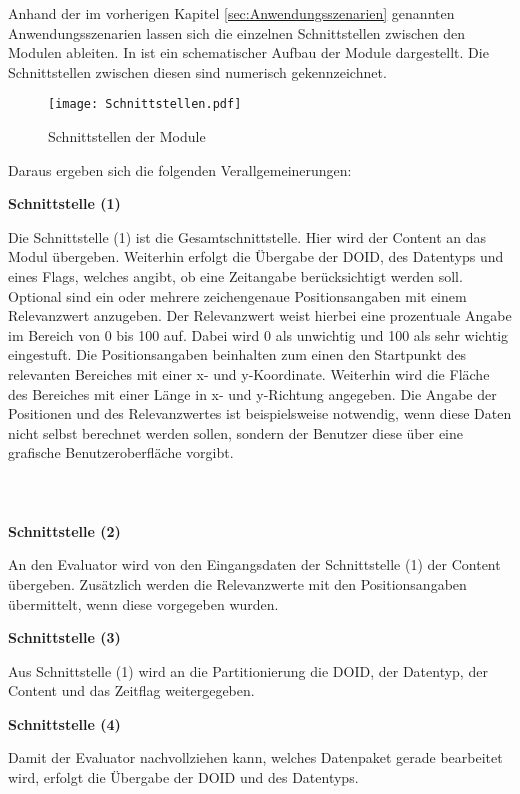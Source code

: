 Anhand der im vorherigen Kapitel \ref{sec:Anwendungsszenarien} genannten Anwendungsszenarien lassen
sich die einzelnen Schnittstellen zwischen den Modulen ableiten. In
 ist ein schematischer Aufbau der Module
dargestellt. Die Schnittstellen zwischen diesen sind numerisch gekennzeichnet.

\begin{figure}[H]
\centering
\texttt{[image: Schnittstellen.pdf]}
\caption{Schnittstellen der Module}
\label{fig:Schnittstellen}
\end{figure}

Daraus ergeben sich die folgenden Verallgemeinerungen:

\textbf{Schnittstelle (1)}

Die Schnittstelle (1) ist die Gesamtschnittstelle. Hier wird der
Content an das Modul übergeben. Weiterhin erfolgt die Übergabe der \gls{DOID}, des
Datentyps und eines Flags, welches angibt, ob eine Zeitangabe berücksichtigt
werden soll.
Optional sind ein oder mehrere zeichengenaue Positionsangaben mit einem
Relevanzwert anzugeben. Der Relevanzwert weist hierbei eine
prozentuale Angabe im Bereich von 0 bis 100 auf. Dabei wird 0 als unwichtig und
100 als sehr wichtig eingestuft. Die Positionsangaben beinhalten zum einen den
Startpunkt des relevanten Bereiches mit einer x- und y-Koordinate. Weiterhin
wird die Fläche des Bereiches mit einer Länge in x- und y-Richtung angegeben.
Die Angabe der Positionen und des Relevanzwertes ist beispielsweise notwendig,
wenn diese Daten nicht selbst berechnet werden sollen, sondern der Benutzer
diese über eine grafische Benutzeroberfläche vorgibt.
\\\\\\\\

\textbf{Schnittstelle (2)} 

An den Evaluator wird von den Eingangsdaten der Schnittstelle (1)
der Content übergeben. Zusätzlich werden die Relevanzwerte mit den
Positionsangaben übermittelt, wenn diese vorgegeben wurden.

\textbf{Schnittstelle (3)} 

Aus Schnittstelle (1) wird an die Partitionierung
die \gls{DOID}, der Datentyp, der Content und das Zeitflag weitergegeben.

\textbf{Schnittstelle (4)} 

Damit der Evaluator nachvollziehen kann, welches Datenpaket gerade bearbeitet
wird, erfolgt die Übergabe der \gls{DOID} und des Datentyps.  

